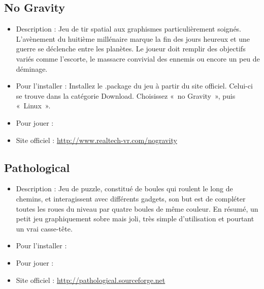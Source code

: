 \subsection{No Gravity}
\begin{itemize}
\begingroup
{}
\item Description : Jeu de tir spatial aux graphismes particulièrement soignés. L'avènement du huitième millénaire marque la fin des jours heureux et une guerre se déclenche entre les planètes. Le joueur doit remplir des objectifs variés comme l'escorte, le massacre convivial des ennemis ou encore un peu de déminage.{\par}
\endgroup
\item Pour l'installer : Installez le .package du jeu à partir du site officiel. Celui-ci se trouve dans la catégorie Download. Choisissez «~no Gravity~», puis «~Linux~».{\par}
\item Pour jouer : 
\item Site officiel : \url{http://www.realtech-vr.com/nogravity}{\par}
\end{itemize}

\subsection{Pathological}
\begin{itemize}
\begingroup
{}
\item Description : Jeu de puzzle, constitué de boules qui roulent le long de chemins, et interagissent avec différents gadgets, son but est de compléter toutes les roues du niveau par quatre boules de même couleur. En résumé, un petit jeu graphiquement sobre mais joli, très simple d'utilisation et pourtant un vrai casse-tête.{\par}
\endgroup
\item Pour l'installer : 
\item Pour jouer : 
\item Site officiel : \url{http://pathological.sourceforge.net}{\par}
\end{itemize}
